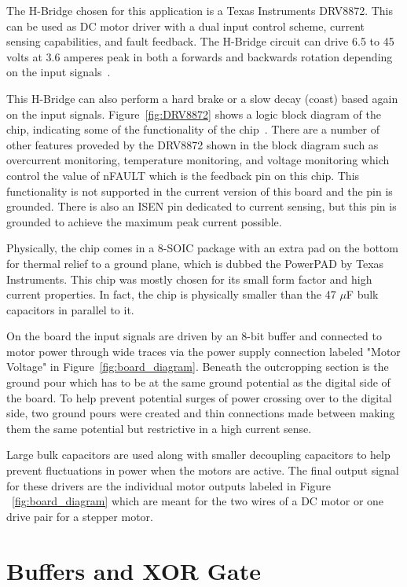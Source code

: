 \documentclass[12pt,oneside,final]{siuethesis}
\theoremstyle{definition}
\begin{document}
The H-Bridge chosen for this application is a Texas Instruments DRV8872. This can be used as DC motor driver with a dual input control scheme, current sensing capabilities, and fault feedback. The H-Bridge circuit can drive 6.5 to 45 volts at 3.6 amperes peak in both a forwards and backwards rotation depending on the input signals~\cite{DRV8872}. 

This H-Bridge can also perform a hard brake or a slow decay (coast) based again on the input signals. Figure~\ref{fig:DRV8872} shows a logic block diagram of the chip, indicating some of the functionality of the chip~\cite{DRV8872}. There are a number of other features proveded by the DRV8872 shown in the block diagram such as overcurrent monitoring, temperature monitoring, and voltage monitoring which control the value of nFAULT which is the feedback pin on this chip. This functionality is not supported in the current version of this board and the pin is grounded. There is also an ISEN pin dedicated to current sensing, but this pin is grounded to achieve the maximum peak current possible. 

Physically, the chip comes in a 8-SOIC package with an extra pad on the bottom for thermal relief to a ground plane, which is dubbed the PowerPAD by Texas Instruments. This chip was mostly chosen for its small form factor and high current properties. In fact, the chip is physically smaller than the 47 $\mu$F bulk capacitors in parallel to it. 

On the board the input signals are driven by an 8-bit buffer and connected to motor power through wide traces via the power supply connection labeled "Motor Voltage" in Figure~\ref{fig:board_diagram}. Beneath the outcropping section is the ground pour which has to be at the same ground potential as the digital side of the board. To help prevent potential surges of power crossing over to the digital side, two ground pours were created and thin connections made between making them the same potential but restrictive in a high current sense.  

Large bulk capacitors are used along with smaller decoupling capacitors to help prevent fluctuations in power when the motors are active. The final output signal for these drivers are the individual motor outputs labeled in Figure ~\ref{fig:board_diagram} which are meant for the two wires of a DC motor or one drive pair for a stepper motor.

\section{Buffers and XOR Gate}
\end{document}
